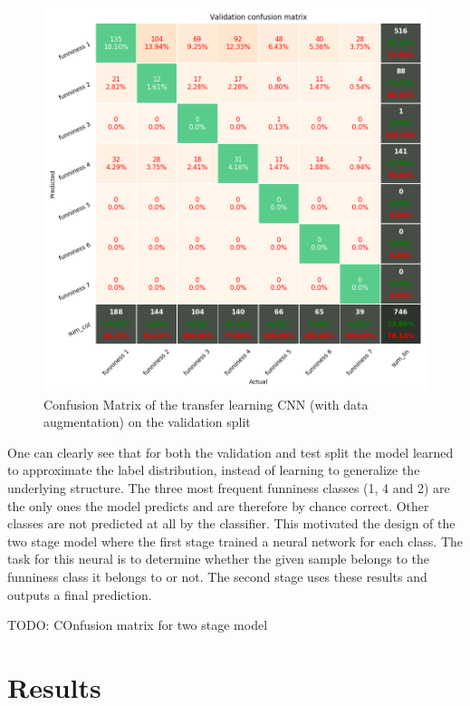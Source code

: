 \documentclass[draft,final,oneside]{vutinfth} %
\begin{document}
\begin{figure}[ht]
	\centering
  	\includegraphics[width=1.0\textwidth]{graphics/transfer_confusion_val.png}
	\caption{Confusion Matrix of the transfer learning CNN (with data augmentation) on the validation split}
	\label{fig:confusionmatrixtransferlearningval}
\end{figure}

One can clearly see that for both the validation and test split the model learned to approximate the label distribution, instead of learning to generalize the underlying structure. The three most frequent funniness classes (1, 4 and 2) are the only ones the model predicts and are therefore by chance correct. Other classes are not predicted at all by the classifier. This motivated the design of the two stage model where the first stage trained a neural network for each class. The task for this neural is to determine whether the given sample belongs to the funniness class it belongs to or not. The second stage uses these results and outputs a final prediction.

TODO: COnfusion matrix for two stage model

\section{Results}
\end{document}
